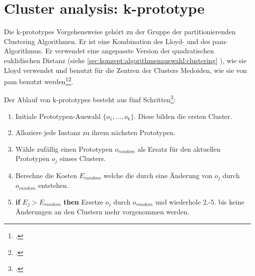 %
%
%


\section{Cluster analysis: k-prototype}
\label{sec:recherche:algorithmen:k-prototypes}
Die k-prototypes Vorgehensweise gehört zu der Gruppe der partitionierenden Clustering Algorithmen. Er ist eine Kombination des Lloyd- und des \gls{pam}- Algorithmus. Er verwendet eine angepasste Version der quadratischen euklidischen Distanz (siehe \cref{sec:konzept:algorithmenauswahl:clustering} ), wie sie Lloyd verwendet und benutzt für die Zentren der Clusters Medoiden, wie sie von \gls{pam} benutzt werden\footcite{data_mining_concepts_and_techniques}\footcite{clustering_numeric_and_categorical_values}.

Der Ablauf von k-prototypes besteht aus fünf Schritten\footcite{clustering_numeric_and_categorical_values}:
\begin{enumerate}
	\item Initiale Prototypen-Auswahl $\{o_1,\ldots,o_k\}$. Diese bilden die ersten Cluster.
	\item Alloziere jede Instanz zu ihrem nächsten Prototypen.
	\item Wähle zufällig einen Prototypen $o_{random}$ als Ersatz für den aktuellen Prototypen $o_j$ einses Clusters.
	\item Berechne die Kosten $E_{random}$ welche die durch eine Änderung von $o_j$ durch $o_{random}$ entstehen.
	\item \textbf{if} $E_j > E_{random}$ \textbf{then} Ersetze $o_j$ durch $o_{random}$ und wiederhole 2.-5. bis keine Änderungen an den Clustern mehr vorgenommen werden.
\end{enumerate}

